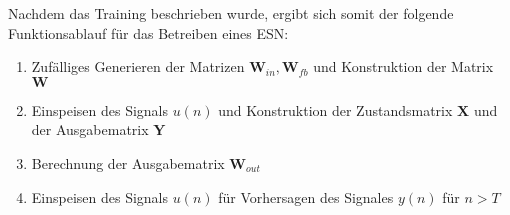 Nachdem das Training beschrieben wurde, ergibt sich somit der folgende Funktionsablauf für das Betreiben eines \textsc{ESN}:

\singlespacing
\begin{enumerate}
	\item Zufälliges Generieren der Matrizen $\mathbf{W}_{in}, \mathbf{W}_{fb}$ und Konstruktion der Matrix $\mathbf{W}$ 
	\item Einspeisen des Signals $u(n)$ und Konstruktion der Zustandsmatrix $\mathbf{X}$ und der Ausgabematrix $\mathbf{Y}$ 
	\item Berechnung der Ausgabematrix $\mathbf{W}_{out}$
	\item Einspeisen des Signals $u(n)$ für Vorhersagen des Signales $y(n)$ für $n > T$
\end{enumerate}
\onehalfspacing